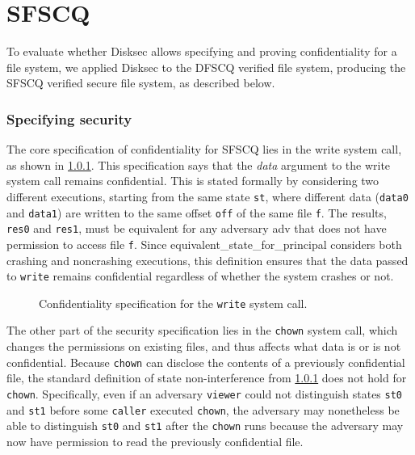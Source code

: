 \chapter{SFSCQ}
\label{chapter:SFSCQ}

To evaluate whether Disksec allows specifying and proving confidentiality
for a file system, we applied Disksec to the DFSCQ verified file system,
producing the SFSCQ verified secure file system, as described below.


\subsection{Specifying security}

The core specification of confidentiality for SFSCQ lies in the
write system call, as shown in \ref{}.  This
specification says that the \emph{data} argument to the {write}
system call remains confidential.  This is stated formally by
considering two different executions, starting from the same
state \texttt{st}, where different data (\texttt{data0} and \texttt{data1})
are written to the same offset \texttt{off} of the same file \texttt{f}.
The results, \texttt{res0} and \texttt{res1}, must be equivalent for any
adversary {adv} that does not have permission to access file \texttt{f}.
Since {equivalent\_state\_for\_principal} considers both crashing and
noncrashing executions, this definition ensures that the data passed to
\texttt{write} remains confidential regardless of whether the system crashes
or not.

\begin{figure}[ht]
  
  \caption{Confidentiality specification for the \texttt{write} system call.}
  \label{fig:writespec}
\end{figure}

The other part of the security specification lies in the \texttt{chown}
system call, which changes the permissions on existing files, and thus
affects what data is or is not confidential.  Because \texttt{chown} can
disclose the contents of a previously confidential file, the standard
definition of state non-interference from \ref{}
does not hold for \texttt{chown}.  Specifically, even if an adversary
\texttt{viewer} could not distinguish states \texttt{st0} and \texttt{st1} before some
\texttt{caller} executed \texttt{chown}, the adversary may nonetheless be able
to distinguish \texttt{st0} and \texttt{st1} after the \texttt{chown} runs because
the adversary may now have permission to read the previously confidential
file.

